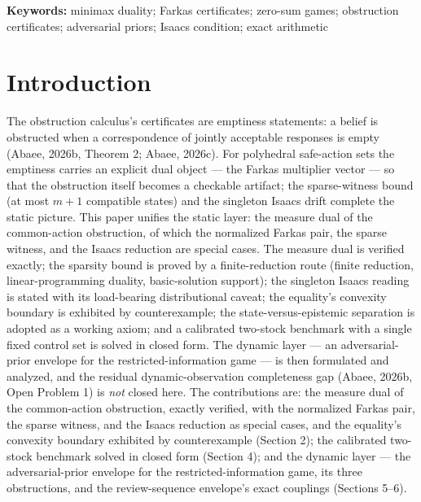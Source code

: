 \documentclass[10pt,twocolumn]{article}
\theoremstyle{definition}
\begin{document}
\vspace{0.4em}
\noindent\textbf{Keywords:} minimax duality; Farkas certificates; zero-sum
games; obstruction certificates; adversarial priors; Isaacs condition;
exact arithmetic

\section{Introduction}

The obstruction calculus's certificates are emptiness statements: a belief is
obstructed when a correspondence of jointly acceptable responses is empty
(Abaee, 2026b, Theorem 2; Abaee, 2026c). For polyhedral safe-action sets the
emptiness carries an explicit dual object --- the Farkas multiplier vector
--- so that the obstruction itself becomes a checkable artifact; the
sparse-witness bound (at most $m+1$ compatible states) and the singleton
Isaacs drift complete the static picture. This paper unifies the static layer: the measure dual of the common-action obstruction, of which the normalized Farkas pair, the sparse witness, and the Isaacs reduction are special cases. The measure dual is verified exactly; the sparsity bound is proved by a finite-reduction route (finite reduction, linear-programming duality, basic-solution support); the singleton Isaacs reading is stated with its load-bearing distributional caveat; the equality's convexity boundary is exhibited by counterexample; the state-versus-epistemic separation is adopted as a working axiom; and a calibrated two-stock benchmark with a single fixed control set is solved in closed form. The dynamic layer --- an adversarial-prior envelope for the restricted-information game --- is then formulated and analyzed, and the residual dynamic-observation completeness gap (Abaee, 2026b, Open Problem 1) is \emph{not} closed here. The contributions are: the measure dual of the common-action obstruction, exactly verified, with the normalized Farkas pair, the sparse witness, and the Isaacs reduction as special cases, and the equality's convexity boundary exhibited by counterexample (Section 2); the calibrated two-stock benchmark solved in closed form (Section 4); and the dynamic layer --- the adversarial-prior envelope for the restricted-information game, its three obstructions, and the review-sequence envelope's exact couplings (Sections 5--6).
\end{document}
